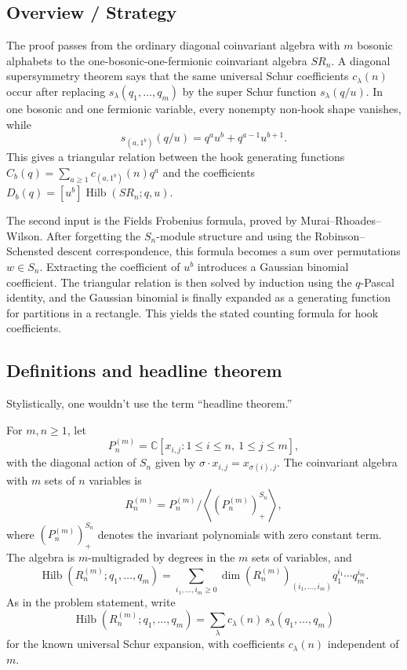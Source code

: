 \documentclass[12pt]{article}
\DeclareMathOperator{\Hilb}{Hilb}
\newcommand{\review}[1]{\begin{reviewbox}#1\end{reviewbox}}
\begin{document}

\date{}


\subsection*{Overview / Strategy}

The proof passes from the ordinary diagonal coinvariant algebra with \(m\) bosonic alphabets to the one-bosonic-one-fermionic coinvariant algebra \(SR_n\).  A diagonal supersymmetry theorem says that the same universal Schur coefficients \(c_\lambda(n)\) occur after replacing \(s_\lambda(q_1,\ldots,q_m)\) by the super Schur function \(s_\lambda(q/u)\).  In one bosonic and one fermionic variable, every nonempty non-hook shape vanishes, while
\[
s_{(a,1^b)}(q/u)=q^a u^b+q^{a-1}u^{b+1}.
\]
This gives a triangular relation between the hook generating functions \(C_b(q)=\sum_{a\ge 1}c_{(a,1^b)}(n)q^a\) and the coefficients \(D_b(q)=[u^b]\Hilb(SR_n;q,u)\).

The second input is the Fields Frobenius formula, proved by Murai--Rhoades--Wilson.  After forgetting the \(S_n\)-module structure and using the Robinson--Schensted descent correspondence, this formula becomes a sum over permutations \(w\in S_n\).  Extracting the coefficient of \(u^b\) introduces a Gaussian binomial coefficient.  The triangular relation is then solved by induction using the \(q\)-Pascal identity, and the Gaussian binomial is finally expanded as a generating function for partitions in a rectangle.  This yields the stated counting formula for hook coefficients.

\subsection{Definitions and headline theorem}

\review{Stylistically, one wouldn't use the term ``headline theorem.''}

For \(m,n\ge 1\), let
\[
P_n^{(m)}=\mathbb C[x_{i,j}:1\le i\le n,\ 1\le j\le m],
\]
with the diagonal action of \(S_n\) given by \(\sigma\cdot x_{i,j}=x_{\sigma(i),j}\).  The coinvariant algebra with \(m\) sets of \(n\) variables is
\[
R_n^{(m)}
=
P_n^{(m)}\big/
\left\langle \left(P_n^{(m)}\right)^{S_n}_{+}\right\rangle,
\]
where \(\left(P_n^{(m)}\right)^{S_n}_{+}\) denotes the invariant polynomials with zero constant term.  The algebra is \(m\)-multigraded by degrees in the \(m\) sets of variables, and
\[
\Hilb(R_n^{(m)};q_1,\ldots,q_m)
=
\sum_{i_1,\ldots,i_m\ge 0}
\dim\!\left(R_n^{(m)}\right)_{(i_1,\ldots,i_m)}
q_1^{i_1}\cdots q_m^{i_m}.
\]
As in the problem statement, write
\[
\Hilb(R_n^{(m)};q_1,\ldots,q_m)
=
\sum_{\lambda} c_\lambda(n)\,s_\lambda(q_1,\ldots,q_m)
\]
for the known universal Schur expansion, with coefficients \(c_\lambda(n)\) independent of \(m\).
\end{document}
